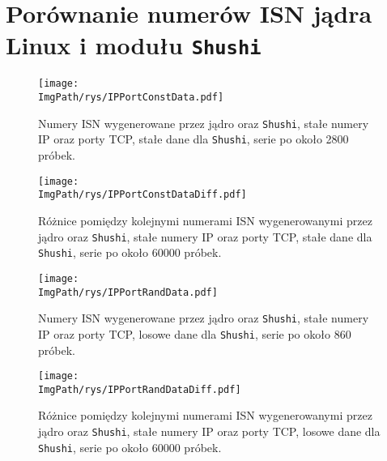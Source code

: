 \documentclass[a4paper,12pt,twoside,openany]{report}
\newcommand{\ImgPath}{.}
\newcommand{\tech}{\texttt}
\begin{document}
\appendix
\chapter{Porównanie numerów ISN jądra Linux i modułu \tech{Shushi}}
\begin{figure}[!htbp]
	\begin{center}
\centering
\texttt{[image: \\ImgPath/rys/IPPortConstData.pdf]}
\end{center}
	\caption{Numery ISN wygenerowane przez jądro oraz \tech{Shushi}, stałe numery IP oraz porty TCP, stałe dane dla \tech{Shushi}, serie po około 2800 próbek.}
	\label{IPPortConstData}
\end{figure}

\begin{figure}[!htbp]
	\begin{center}
\centering
\texttt{[image: \\ImgPath/rys/IPPortConstDataDiff.pdf]}
\end{center}
	\caption{Różnice pomiędzy kolejnymi numerami ISN wygenerowanymi przez jądro oraz \tech{Shushi}, stałe numery IP oraz porty TCP, stałe dane dla \tech{Shushi}, serie po około 60000 próbek.}
	\label{IPPortConstDataDiff}
\end{figure}

\begin{figure}[!htbp]
	\begin{center}
\centering
\texttt{[image: \\ImgPath/rys/IPPortRandData.pdf]}
\end{center}
	\caption{Numery ISN wygenerowane przez jądro oraz \tech{Shushi}, stałe numery IP oraz porty TCP, losowe dane dla \tech{Shushi}, serie po około 860 próbek.}
	\label{IPPortRandData}
\end{figure}

\begin{figure}[!htbp]
	\begin{center}
\centering
\texttt{[image: \\ImgPath/rys/IPPortRandDataDiff.pdf]}
\end{center}
	\caption{Różnice pomiędzy kolejnymi numerami ISN wygenerowanymi przez jądro oraz \tech{Shushi}, stałe numery IP oraz porty TCP, losowe dane dla \tech{Shushi}, serie po około 60000 próbek.}
	\label{IPPortRandDataDiff}
\end{figure}
\end{document}
